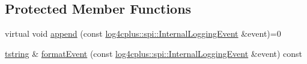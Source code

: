 \subsection*{Protected Member Functions}
\begin{DoxyCompactItemize}
\item 
virtual void \hyperlink{classlog4cplus_1_1Appender_aa0c58458ad4d5db5074d26b9e82aba40}{append} (const \hyperlink{classlog4cplus_1_1spi_1_1InternalLoggingEvent}{log4cplus\-::spi\-::\-Internal\-Logging\-Event} \&event)=0
\item 
\hyperlink{namespacelog4cplus_a3c9287f6ebcddc50355e29d71152117b}{tstring} \& \hyperlink{classlog4cplus_1_1Appender_a35f7ed15b11db14559f15a12b5cc89c7}{format\-Event} (const \hyperlink{classlog4cplus_1_1spi_1_1InternalLoggingEvent}{log4cplus\-::spi\-::\-Internal\-Logging\-Event} \&event) const 
\end{DoxyCompactItemize}
